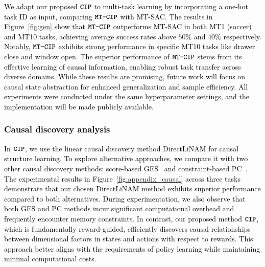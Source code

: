 \textcolor{black}{We adapt our proposed $\texttt{\textbf{CIP}}$ to multi-task learning  by incorporating a one-hot task ID as input, comparing $\texttt{\textbf{MT-CIP}}$ with MT-SAC. The results in Figure~\ref{fig:gen} show that $\texttt{\textbf{MT-CIP}}$ outperforms MT-SAC in both MT1 (soccer) and MT10 tasks, achieving average success rates above $50\%$ and $40\%$ respectively. Notably, $\texttt{\textbf{MT-CIP}}$ exhibits strong performance in specific MT10 tasks like drawer close and window open. 
The superior performance of $\texttt{\textbf{MT-CIP}}$ stems from its effective learning of causal information, enabling robust task transfer across diverse domains. While these results are promising, future work will focus on causal state abstraction for enhanced generalization and sample efficiency. All experiments were conducted under the same hyperparameter settings, and the implementation will be made publicly available.}

\textcolor{black}{
\vspace{-5mm}
\subsubsection{Causal discovery analysis}
In $\texttt{\textbf{CIP}}$, we use the linear causal discovery method DirectLiNAM for causal structure learning. To explore alternative approaches, we compare it with two other causal discovery methods: score-based GES~\citep{chickering2002optimal} and constraint-based PC~\citep{spirtes2001causation}. The experimental results in Figure~\ref{fig:appendix_causal} across three tasks demonstrate that our chosen DirectLiNAM method exhibits superior performance compared to both alternatives. 
During experimentation, we also observe that both GES and PC methods incur significant computational overhead and frequently encounter memory constraints. In contrast, our proposed method $\texttt{\textbf{CIP}}$, which is fundamentally reward-guided, efficiently discovers causal relationships between dimensional factors in states and actions with respect to rewards. This approach better aligns with the requirements of policy learning while maintaining minimal computational costs.
}


